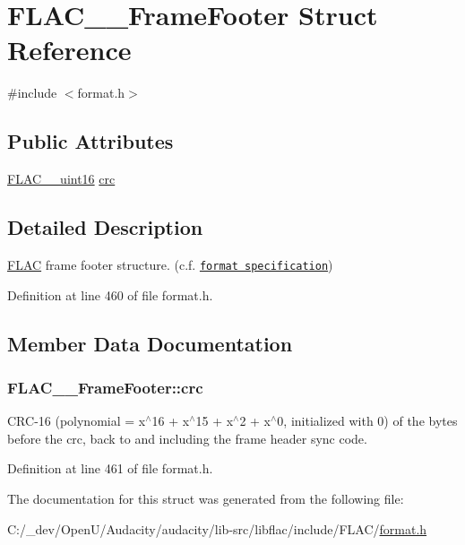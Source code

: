 \hypertarget{struct_f_l_a_c_____frame_footer}{}\section{F\+L\+A\+C\+\_\+\+\_\+\+Frame\+Footer Struct Reference}
\label{struct_f_l_a_c_____frame_footer}


{\ttfamily \#include $<$format.\+h$>$}

\subsection*{Public Attributes}
\begin{DoxyCompactItemize}
\item 
\hyperlink{ordinals_8h_a0fbaee65d056a075245dcd0c903fb94c}{F\+L\+A\+C\+\_\+\+\_\+uint16} \hyperlink{struct_f_l_a_c_____frame_footer_abdd6d64bf281c49c720b97b955d4eee7}{crc}
\end{DoxyCompactItemize}


\subsection{Detailed Description}
\hyperlink{namespace_f_l_a_c}{F\+L\+AC} frame footer structure. (c.\+f. \href{../format.html#frame_footer}{\tt format specification}) 

Definition at line 460 of file format.\+h.



\subsection{Member Data Documentation}
\subsubsection[{\texorpdfstring{crc}{crc}}]{ F\+L\+A\+C\+\_\+\+\_\+\+Frame\+Footer\+::crc}\hypertarget{struct_f_l_a_c_____frame_footer_abdd6d64bf281c49c720b97b955d4eee7}{}\label{struct_f_l_a_c_____frame_footer_abdd6d64bf281c49c720b97b955d4eee7}
C\+R\+C-\/16 (polynomial = x$^\wedge$16 + x$^\wedge$15 + x$^\wedge$2 + x$^\wedge$0, initialized with 0) of the bytes before the crc, back to and including the frame header sync code. 

Definition at line 461 of file format.\+h.



The documentation for this struct was generated from the following file\+:\begin{DoxyCompactItemize}
\item 
C\+:/\+\_\+dev/\+Open\+U/\+Audacity/audacity/lib-\/src/libflac/include/\+F\+L\+A\+C/\hyperlink{include_2_f_l_a_c_2format_8h}{format.\+h}\end{DoxyCompactItemize}
